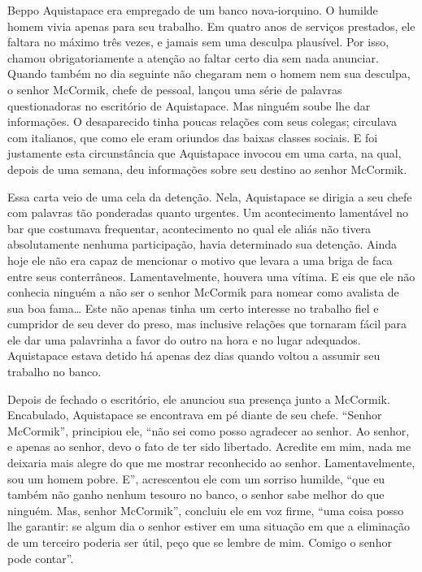 Beppo Aquistapace era empregado de um banco nova-iorquino. O humilde
homem vivia apenas para seu trabalho. Em quatro anos de serviços
prestados, ele faltara no máximo três vezes, e jamais sem uma desculpa
plausível. Por isso, chamou obrigatoriamente a atenção ao faltar certo
dia sem nada anunciar. Quando também no dia seguinte não chegaram nem o
homem nem sua desculpa, o senhor McCormik, chefe de pessoal, lançou uma
série de palavras questionadoras no escritório de Aquistapace. Mas
ninguém soube lhe dar informações. O desaparecido tinha poucas relações
com seus colegas; circulava com italianos, que como ele eram oriundos
das baixas classes sociais. E foi justamente esta circunstância que
Aquistapace invocou em uma carta, na qual, depois de uma semana, deu
informações sobre seu destino ao senhor McCormik.

Essa carta veio de uma cela da detenção. Nela, Aquistapace se dirigia a
seu chefe com palavras tão ponderadas quanto urgentes. Um acontecimento
lamentável no bar que costumava frequentar, acontecimento no qual ele
aliás não tivera absolutamente nenhuma participação, havia determinado
sua detenção. Ainda hoje ele não era capaz de mencionar o motivo que
levara a uma briga de faca entre seus conterrâneos. Lamentavelmente,
houvera uma vítima. E eis que ele não conhecia ninguém a não ser o
senhor McCormik para nomear como avalista de sua boa fama\ldots{} Este não
apenas tinha um certo interesse no trabalho fiel e cumpridor de seu
dever do preso, mas inclusive relações que tornaram fácil para ele dar
uma palavrinha a favor do outro na hora e no lugar adequados.
Aquistapace estava detido há apenas dez dias quando voltou a assumir seu
trabalho no banco.

Depois de fechado o escritório, ele anunciou sua presença junto a
McCormik. Encabulado, Aquistapace se encontrava em pé diante de seu
chefe. ``Senhor McCormik'', principiou ele, ``não sei como posso
agradecer ao senhor. Ao senhor, e apenas ao senhor, devo o fato de ter
sido libertado. Acredite em mim, nada me deixaria mais alegre do que me
mostrar reconhecido ao senhor. Lamentavelmente, sou um homem pobre. E'',
acrescentou ele com um sorriso humilde, ``que eu também não ganho nenhum
tesouro no banco, o senhor sabe melhor do que ninguém. Mas, senhor
McCormik'', concluiu ele em voz firme, ``uma coisa posso lhe garantir:
se algum dia o senhor estiver em uma situação em que a eliminação de um
terceiro poderia ser útil, peço que se lembre de mim. Comigo o senhor
pode contar''.




